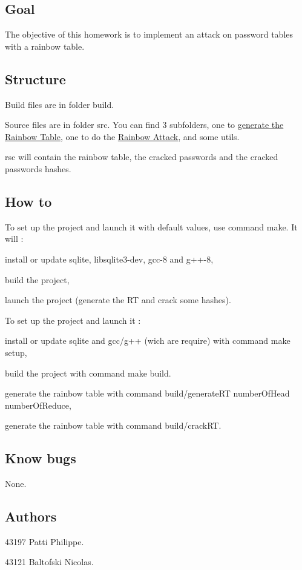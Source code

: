 \subsection*{Goal}

The objective of this homework is to implement an attack on password tables with a rainbow table.

\subsection*{Structure}

Build files are in folder {\ttfamily build}.

Source files are in folder {\ttfamily src}. You can find 3 subfolders, one to \hyperlink{namespacebe_1_1esi_1_1secl_1_1pn_af8b773cad93b0eb78b89f69721e4bb1d}{generate the Rainbow Table}, one to do the \hyperlink{namespacebe_1_1esi_1_1secl_1_1pn_aad832fb30fa4cc9e74d15d7129d0c929}{Rainbow Attack}, and some utils.

{\ttfamily rsc} will contain the rainbow table, the cracked passwords and the cracked passwords hashes.

\subsection*{How to}

To set up the project and launch it with default values, use command {\ttfamily make}. It will \+:
\begin{DoxyItemize}
\item install or update {\ttfamily sqlite}, {\ttfamily libsqlite3-\/dev}, {\ttfamily gcc-\/8} and {\ttfamily g++-\/8},
\item build the project,
\item launch the project (generate the RT and crack some hashes).
\end{DoxyItemize}

To set up the project and launch it \+:
\begin{DoxyItemize}
\item install or update sqlite and gcc/g++ (wich are require) with command {\ttfamily make setup},
\item build the project with command {\ttfamily make build}.
\item generate the rainbow table with command {\ttfamily build/generate\+RT number\+Of\+Head number\+Of\+Reduce},
\item generate the rainbow table with command {\ttfamily build/crack\+RT}.
\end{DoxyItemize}

\subsection*{Know bugs}

None.

\subsection*{Authors}

43197 Patti Philippe.

43121 Baltofski Nicolas. 